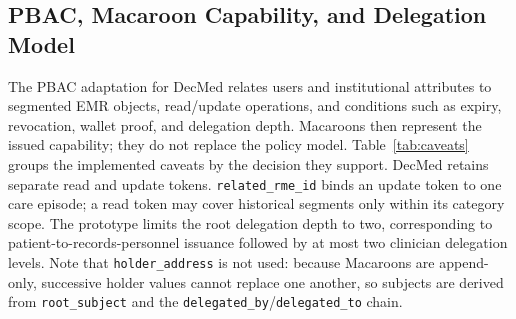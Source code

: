 \documentclass[conference,a4paper,english]{IEEEtran}
\begin{document}
\subsection{PBAC, Macaroon Capability, and Delegation Model}

The PBAC adaptation for DecMed relates users and institutional attributes to segmented EMR objects, read/update operations, and conditions such as expiry, revocation, wallet proof, and delegation depth. Macaroons then represent the issued capability; they do not replace the policy model. Table~\ref{tab:caveats} groups the implemented caveats by the decision they support. DecMed retains separate read and update tokens. \texttt{related\_rme\_id} binds an update token to one care episode; a read token may cover historical segments only within its category scope. The prototype limits the root delegation depth to two, corresponding to patient-to-records-personnel issuance followed by at most two clinician delegation levels. Note that \texttt{holder\_address} is not used: because Macaroons are append-only, successive holder values cannot replace one another, so subjects are derived from \texttt{root\_subject} and the \texttt{delegated\_by}/\texttt{delegated\_to} chain.
\end{document}

